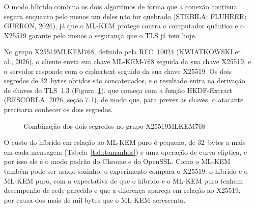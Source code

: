 \documentclass[12pt,a4paper]{article}
\newcommand{\fonte}[1]{\par\vspace{4pt}{\small Fonte: #1}}
\begin{document}
O modo híbrido combina os dois algoritmos de forma que a conexão continua
segura enquanto pelo menos um deles não for quebrado (STEBILA; FLUHRER;
GUERON, 2026), já que o ML-KEM protege contra o computador quântico e o
X25519 garante pelo menos a segurança que o TLS já tem hoje.

No grupo X25519MLKEM768, definido pela RFC~10024 (KWIATKOWSKI et al.,
2026), o cliente envia sua chave ML-KEM-768 seguida da sua chave X25519, e
o servidor responde com o ciphertext seguido da sua chave X25519. Os dois
segredos de 32~bytes obtidos são concatenados, e o resultado entra na derivação de chaves do TLS~1.3
(Figura~\ref{fig:hibrido}), que começa com a função HKDF-Extract (RESCORLA,
2026, seção 7.1), de modo que, para prever as chaves, o atacante
precisaria conhecer os dois segredos.

\begin{figure}[H]
\centering
\caption{Combinação dos dois segredos no grupo X25519MLKEM768}
\label{fig:hibrido}
\fonte{Elaborado pelos autores com base em Kwiatkowski et al. (2026).}
\end{figure}

O custo do híbrido em relação ao ML-KEM puro é pequeno, de 32~bytes a mais
em cada mensagem (Tabela~\ref{tab:tamanhos}) e uma operação de curva
elíptica, e por isso ele é o modo padrão do Chrome e do OpenSSL. Como o
ML-KEM também pode ser usado sozinho, o experimento compara o X25519, o
híbrido e o ML-KEM puro, com a expectativa de que o híbrido e o ML-KEM puro
tenham desempenho de rede parecido e que a diferença apareça em relação ao
X25519, por causa dos mais de mil bytes que o ML-KEM acrescenta.
\end{document}
